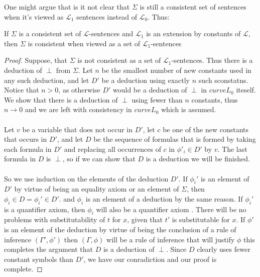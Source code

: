 \documentclass[9pt,a4paper, twocolumn]{article}
\newcommand{\curveL}{\mathcal{L}}
\begin{document}
        One might argue that is it not clear that $\Sigma$ is still a consistent set of sentences when it's viewed as $\curveL_1$ sentences instead of $\curveL_0$. Thus:
        \begin{lemma}
            If $\Sigma$ is a consistent set of $\curveL$-sentences and $\curveL_1$ is an extension by constants of $\curveL$, then $\Sigma$ is consistent when viewed as a set of $\curveL_1$-sentences
        \end{lemma}
        \begin{proof}
            Suppose, that $\Sigma$ is not consistent as a set of $\curveL_1$-sentences. Thus there is a deduction of $\perp$ from $\Sigma$. Let $n$ be the smallest number of new constants used in any such deduction, and let $D'$ be a deduction using exactly $n$ such sconstatns. Notice that $n>0$, as otherwise $D'$ would be a deduction of $\perp$ in $curveL_0$ iteself. We show that there is a deduction of $\perp$ using fewer than $n$ constants, thus $n\rightarrow 0$ and we are left with consistency in $curveL_0$ which is assumed.
            \\
            \\
            Let $v$ be a variable that does not occur in $D'$, let $c$ be one of the new constants that occurs in $D'$, and let $D$ be the sequence of formulas that is formed by taking each formula in $D'$ and replacing all occurrences of $c$ in $\phi'_i\in D'$ by $v$. The last formula in $D$ is $\perp$, so if we can show that $D$ is a deduction we will be finished. 
            \\
            \\
            So we use induction on the elements of the deduction $D'$. If $\phi_i'$ is an element of $D'$ by virtue of being an equality axiom or an element of $\Sigma$, then $\phi_i \in D = \phi_i'\in D'$. and $\phi_i$ is an element of a deduction by the same reason. If $\phi_i'$ is a quantifier axiom, then $\phi_i$ will also be a quantifier axiom . There will be no problems with substitutability of $t$ for $x$, given that $t'$ is substitutable for $x$. If $\phi'$ is an element of the deduction by virtue of being the conclusion of a rule of inference $(\Gamma',\phi')$ then $(\Gamma, \phi)$ will be a rule of inference that will justify $\phi$ this completes the argument that $D$ is a deduction of $\perp$. Since $D$ clearly uses fewer constant symbols than $D'$, we have our conradiction and our proof is complete.
        \end{proof}
        \\
\end{document}
